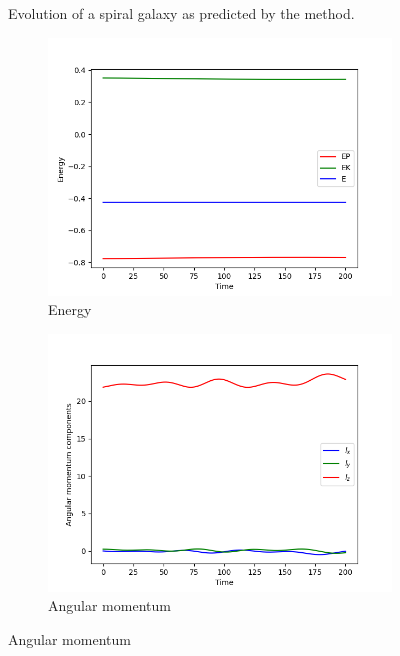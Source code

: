 \begin{figure}[htp]
    \caption{Evolution of a spiral galaxy as predicted by the \PThreeM{} method.}
    \label{fig:spiral-galaxy-evolution-p3m}
\end{figure}

\begin{figure}[htp]
    \centering
    \begin{subfigure}[b]{0.45\textwidth}
        \centering
        \includegraphics[width=\textwidth]{chapters/results/img/p3m-galaxy/energy.png}
        \caption{Energy}
        \label{fig:physical-quantities-p3m-sub1}
    \end{subfigure}
    \hfill
    \begin{subfigure}[b]{0.45\textwidth}
        \centering
        \includegraphics[width=\textwidth]{chapters/results/img/p3m-galaxy/angular-momentum.png}
        \caption{Angular momentum}
        \label{fig:physical-quantities-p3m-sub2}
    \end{subfigure}


\end{figure}
